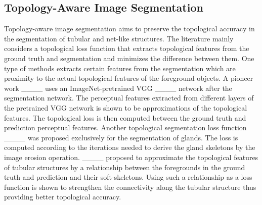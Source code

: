 \subsection{Topology-Aware Image Segmentation}
Topology-aware image segmentation aims to preserve the topological accuracy in the segmentation of tubular and net-like structures. The literature mainly considers a topological loss function that extracts topological features from the ground truth and segmentation and minimizes the difference between them. One type of methods extracts certain features from the segmentation which are proximity to the actual topological features of the foreground objects. A pioneer work ____ uses an ImageNet-pretrained VGG ____ network after the segmentation network. The perceptual features extracted from different layers of the pretrained VGG network is shown to be approximations of the topological features. The topological loss is then computed between the ground truth and prediction perceptual features. Another topological segmentation loss function ____ was proposed exclusively for the segmentation of glands. The loss is computed according to the iterations needed to derive the gland skeletons by the image erosion operation. ____ proposed to approximate the topological features of tubular structures by a relationship between the foregrounds in the ground truth and prediction and their soft-skeletons. Using such a relationship as a loss function is shown to strengthen the connectivity along the tubular structure thus providing better topological accuracy. 

